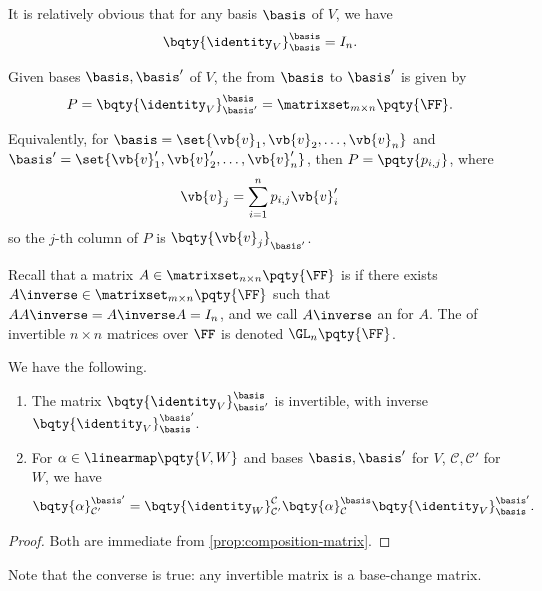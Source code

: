 It is relatively obvious that for any basis \(\basis\) of \(V\), we have
\[
    \bqty{\identity_V}_{\basis}^{\basis} = I_n.
\]

\begin{definition}
    Given bases \(\basis, \basis'\) of \(V\), the  from \(\basis\) to \(\basis'\) is given by
    \[
        P = \bqty{\identity_V}_{\basis'}^{\basis} = \matrixset_{m \times n} \pqty{\FF}.
    \]

    Equivalently, for \(\basis = \set{\vb{v}_1, \vb{v}_2, \ldots, \vb{v}_n}\) and \(\basis' = \set{\vb{v}_1', \vb{v}_2', \ldots, \vb{v}_n'}\), then \(P = \pqty{p_{i, j}}\), where
    \[
        \vb{v}_j = \sum_{i = 1}^{n} p_{i, j} \vb{v}_i'
    \]
    so the \(j\)-th column of \(P\) is \(\bqty{\vb{v}_j}_{\basis'}\).
\end{definition}

Recall that a matrix \(A \in \matrixset_{n \times n} \pqty{\FF}\) is  if there exists \(A\inverse \in \matrixset_{m \times n} \pqty{\FF}\) such that \(A A\inverse = A\inverse A = I_n\), and we call \(A\inverse\) an  for \(A\). The  of invertible \(n \times n\) matrices over \(\FF\) is denoted \(\GL_n \pqty{\FF}\).

\begin{proposition}
    \label{prop:change-of-basis-matrix}%
    We have the following.

    \begin{enumerate}[label=(\roman*)]
        \item The matrix \(\bqty{\identity_V}_{\basis'}^{\basis}\) is invertible, with inverse \(\bqty{\identity_V}_{\basis}^{\basis'}\).
        \item {} For \(\alpha \in \linearmap\pqty{V, W}\) and bases \(\basis, \basis'\) for \(V\), \(\mathcal{C}, \mathcal{C}'\) for \(W\), we have
        \[
            \bqty{\alpha}_{\mathcal{C}'}^{\basis'} = \bqty{\identity_W}_{\mathcal{C}'}^{\mathcal{C}} \bqty{\alpha}_{\mathcal{C}}^{\basis} \bqty{\identity_V}_{\basis}^{\basis'}.
        \]
    \end{enumerate}
\end{proposition}

\begin{proof}
    Both are immediate from \autoref{prop:composition-matrix}.
\end{proof}

Note that the converse is true: any invertible matrix is a base-change matrix.

